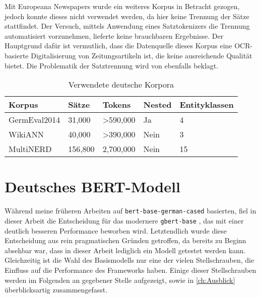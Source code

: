 Mit Europeana Newspapers \parencite{europeana} wurde ein weiteres Korpus in Betracht gezogen, jedoch konnte dieses nicht verwendet werden, da hier keine Trennung der Sätze stattfindet. Der Versuch, mittels Anwendung eines Satztokenizers die Trennung automatisiert vorzunehmen, lieferte keine brauchbaren Ergebnisse. Der Hauptgrund dafür ist vermutlich, dass die Datenquelle dieses Korpus eine OCR-basierte Digitalisierung von Zeitungsartikeln ist, die keine ausreichende Qualität bietet. Die Problematik der Satztrennung wird von  ebenfalls beklagt.

\begin{table}[!htbp]
	\centering
	\caption{Verwendete deutsche Korpora}
	\label{tab:korpora}
	\begin{tabular}{@{}lllll@{}}
		\toprule
		\textbf{Korpus}   & \textbf{Sätze} & \textbf{Tokens}       & \textbf{Nested} & \textbf{Entityklassen} \\ \midrule
		GermEval2014    & 31,000         & \textgreater{}590,000 & Ja              & 4                       \\
		WikiANN         & 40,000         & \textgreater{}390,000 & Nein            & 3                       \\
		MultiNERD\footnotemark       & 156,800        & 2,700,000             & Nein            & 15                      \\ \bottomrule
		\end{tabular}
\end{table}

\section{Deutsches BERT-Modell}
\label{ch:Training:sec:DeutschBERT}

Während meine früheren Arbeiten auf \verb|bert-base-german-cased| \parencite{bert-base-german-cased} basierten, fiel in dieser Arbeit die Entscheidung für das modernere \verb|gbert-base| \parencite{gbert}, das mit einer deutlich besseren Performance beworben wird. Letztendlich wurde diese Entscheidung aus rein pragmatischen Gründen getroffen, da bereits zu Beginn absehbar war, dass in dieser Arbeit lediglich ein Modell getestet werden kann. Gleichzeitig ist die Wahl des Basismodells nur eine der vielen Stellschrauben, die Einfluss auf die Performance des Frameworks haben. Einige dieser Stellschrauben werden im Folgenden an gegebener Stelle aufgezeigt, sowie in \autoref{ch:Ausblick} überblicksartig zusammengefasst.


